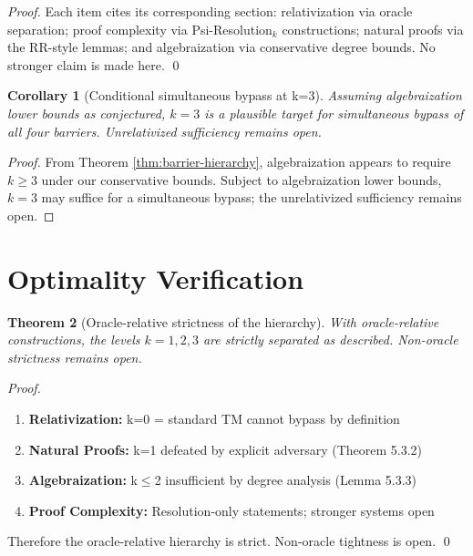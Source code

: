 \documentclass[11pt]{article}
\newtheorem{theorem}{Theorem}[section]
\newtheorem{corollary}[theorem]{Corollary}
\theoremstyle{definition}
\begin{document}
\begin{proof}
Each item cites its corresponding section: relativization via oracle separation; proof complexity via Psi-Resolution$_k$ constructions; natural proofs via the RR-style lemmas; and algebraization via conservative degree bounds. No stronger claim is made here. \qed
\end{proof}

\begin{corollary}[Conditional simultaneous bypass at k=3]
\label{cor:optimal-k}
Assuming algebraization lower bounds as conjectured, $k=3$ is a plausible target for simultaneous bypass of all four barriers. Unrelativized sufficiency remains open.
\end{corollary}

\begin{proof}
From Theorem \ref{thm:barrier-hierarchy}, algebraization appears to require $k \geq 3$ under our conservative bounds. Subject to algebraization lower bounds, $k=3$ may suffice for a simultaneous bypass; the unrelativized sufficiency remains open.
\end{proof}

\section{Optimality Verification}

\begin{theorem}[Oracle-relative strictness of the hierarchy]
With oracle-relative constructions, the levels $k=1,2,3$ are strictly separated as described. Non-oracle strictness remains open.
\end{theorem}

\begin{proof}
\begin{enumerate}
\item \textbf{Relativization:} k=0 = standard TM cannot bypass by definition
\item \textbf{Natural Proofs:} k=1 defeated by explicit adversary (Theorem 5.3.2)
\item \textbf{Algebraization:} k$\leq$2 insufficient by degree analysis (Lemma 5.3.3)
\item \textbf{Proof Complexity:} Resolution-only statements; stronger systems open
\end{enumerate}
Therefore the oracle-relative hierarchy is strict. Non-oracle tightness is open. \qed
\end{proof}
\end{document}
